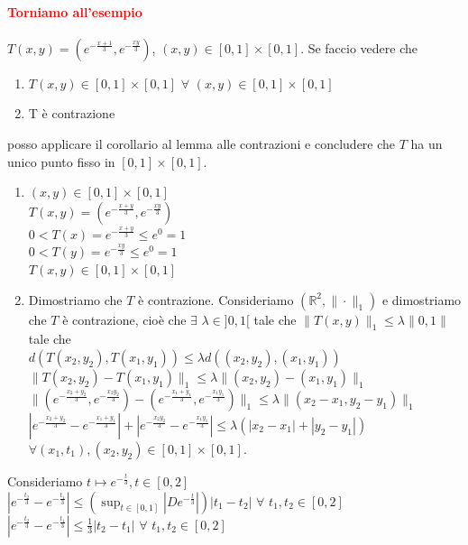 \documentclass{article}
\newcommand{\R}{\mathbb{R}}
\begin{document}
\paragraph{\textcolor{red}{Torniamo all'esempio}}
$T(x,y)= (e^{-\frac{x+1}{3}},e^{-\frac{xy}{3}})$, $(x,y)\in [0,1]\times[0,1]$. Se faccio vedere che 
\begin{enumerate}
    \item $T(x,y)\in [0,1]\times[0,1] \,\, \forall\,\, (x,y)\in [0,1]\times[0,1]$
    \item T è contrazione
\end{enumerate}
posso applicare il corollario al lemma alle contrazioni e concludere che $T$ ha un unico punto fisso in $[0,1]\times[0,1]$.
\begin{enumerate}
    \item $(x,y)\in [0,1]\times[0,1]$\\
    $T(x,y)=(e^{-\frac{x+y}{3}},e^{-\frac{xy}{3}})$\\
    $0 < T(x)=e^{-\frac{x+y}{3}}\leq e^0=1$\\
    $0< T(y)=e^{-\frac{xy}{3}}\leq e^0=1 $\\
    $T(x,y)\in [0,1]\times[0,1]$
    \item Dimostriamo che $T$ è contrazione. Consideriamo $(\R^2,\|\cdot\|_1)$ e dimostriamo che $T$
    è contrazione, cioè che $\exists \,\, \lambda \in ]0,1[$ tale che $\| T(x,y) \|_1\leq \lambda \|0,1\|$ tale che\\
    $d(T(x_2,y_2),T(x_1,y_1))\leq \lambda d((x_2,y_2),(x_1,y_1))$\\
    $\|T(x_2,y_2)-T(x_1,y_1)\|_1\leq \lambda \| (x_2,y_2)-(x_1,y_1)\|_1$\\
    $\|(e^{-\frac{x_2+y_2}{3}},e^{-\frac{x_2y_2}{3}}) - (e^{-\frac{x_1+y_1}{3}},e^{-\frac{x_1y_1}{3}}) \|_1 \leq \lambda \| (x_2-x_1,y_2-y_1)\|_1$\\
    $|e^{-\frac{x_2+y_2}{3}}-e^{-\frac{x_1+y_1}{3}}| +|e^{-\frac{x_2y_2}{3}}-e^{-\frac{x_1y_1}{3}}|\leq \lambda (|x_2-x_1|+|y_2-y_1|)$\\
    $\forall (x_1,t_1),(x_2,y_2)\in [0,1]\times[0,1]$.
\end{enumerate}
Consideriamo $t \mapsto e^{-\frac{t}{3}},t \in [0,2]$\\
$|e^{-\frac{t_2}{3}}-e^{-\frac{t_1}{3}}|\leq \left( \sup_{t \in [0,1]}|De^{-\frac{t}{3}}| \right)|t_1-t_2|\,\,\forall \,\, t_1,t_2 \in [0,2]$\\
$|e^{-\frac{t_2}{3}}-e^{-\frac{t_1}{3}}| \leq \frac{1}{3}|t_2-t_1| \,\, \forall \,\, t_1,t_2 \in [0,2]$\\
\end{document}
